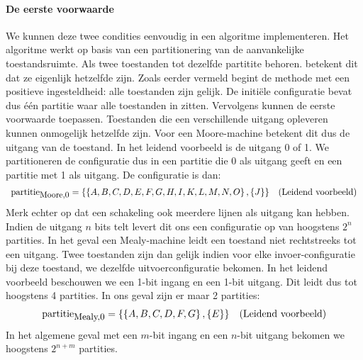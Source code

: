 \paragraph{De eerste voorwaarde}We kunnen deze twee condities eenvoudig in een algoritme implementeren. Het algoritme werkt op basis van een partitionering van de aanvankelijke toestandsruimte. Als twee toestanden tot dezelfde partitite behoren. betekent dit dat ze eigenlijk hetzelfde zijn. Zoals eerder vermeld begint de methode met een positieve ingesteldheid: alle toestanden zijn gelijk. De initi\"ele configuratie bevat dus \'e\'en partitie waar alle toestanden in zitten. Vervolgens kunnen de eerste voorwaarde toepassen. Toestanden die een verschillende uitgang opleveren kunnen onmogelijk hetzelfde zijn. Voor een Moore-machine betekent dit dus de uitgang van de toestand. In het leidend voorbeeld is de uitgang 0 of 1. We partitioneren de configuratie dus in een partitie die 0 als uitgang geeft en een partitie met 1 als uitgang. De configuratie is dan:
\begin{equation}
\begin{array}{lr}
\mbox{partitie}_{\mbox{\small{Moore,0}}}=\left\{\left\{A,B,C,D,E,F,G,H,I,K,L,M,N,O\right\},\left\{J\right\}\right\}&\mbox{(Leidend voorbeeld)}
\end{array}
\end{equation}
Merk echter op dat een schakeling ook meerdere lijnen als uitgang kan hebben. Indien de uitgang $n$ bits telt levert dit ons een configuratie op van hoogstens $2^n$ partities. In het geval een Mealy-machine leidt een toestand niet rechtstreeks tot een uitgang. Twee toestanden zijn dan gelijk indien voor elke invoer-configuratie bij deze toestand, we dezelfde uitvoerconfiguratie bekomen. In het leidend voorbeeld beschouwen we een 1-bit ingang en een 1-bit uitgang. Dit leidt dus tot hoogstens 4 partities. In ons geval zijn er maar 2 partities:
\begin{equation}
\begin{array}{lr}
\mbox{partitie}_{\mbox{\small{Mealy,0}}}=\left\{\left\{A,B,C,D,F,G\right\},\left\{E\right\}\right\}&\mbox{(Leidend voorbeeld)}
\end{array}
\end{equation}
In het algemene geval met een $m$-bit ingang en een $n$-bit uitgang bekomen we hoogstens $2^{n+m}$ partities.

